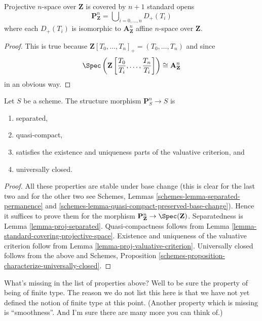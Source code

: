\begin{lemma}
\label{lemma-standard-covering-projective-space}
Projective $n$-space over $\mathbf{Z}$ is covered by
$n + 1$ standard opens
$$
\mathbf{P}^n_{\mathbf{Z}} =
\bigcup\nolimits_{i = 0, \ldots, n} D_{+}(T_i)
$$
where each $D_{+}(T_i)$ is isomorphic to $\mathbf{A}^n_{\mathbf{Z}}$
affine $n$-space over $\mathbf{Z}$.
\end{lemma}

\begin{proof}
This is true because
$\mathbf{Z}[T_0, \ldots, T_n]_{+} = (T_0, \ldots, T_n)$ and
since
$$
\Spec
\left(
\mathbf{Z}
\left[\frac{T_0}{T_i}, \ldots, \frac{T_n}{T_i}
\right]
\right)
\cong
\mathbf{A}^n_{\mathbf{Z}}
$$
in an obvious way.
\end{proof}

\begin{lemma}
\label{lemma-projective-space-separated}
Let $S$ be a scheme.
The structure morphism $\mathbf{P}^n_S \to S$ is
\begin{enumerate}
\item separated,
\item quasi-compact,
\item satisfies the existence and uniqueness parts of the valuative criterion,
and
\item universally closed.
\end{enumerate}
\end{lemma}

\begin{proof}
All these properties are stable under base change (this is clear for the
last two and for the other two see
Schemes, Lemmas
\ref{schemes-lemma-separated-permanence} and
\ref{schemes-lemma-quasi-compact-preserved-base-change}).
Hence it suffices to prove them for the morphism
$\mathbf{P}^n_{\mathbf{Z}} \to \Spec(\mathbf{Z})$.
Separatedness is Lemma \ref{lemma-proj-separated}. Quasi-compactness follows
from Lemma \ref{lemma-standard-covering-projective-space}.
Existence and uniqueness of the valuative criterion follow from
Lemma \ref{lemma-proj-valuative-criterion}.
Universally closed follows from the above and
Schemes, Proposition \ref{schemes-proposition-characterize-universally-closed}.
\end{proof}

\begin{remark}
\label{remark-missing-finite-type}
What's missing in the list of properties above? Well to be sure the property
of being of finite type. The reason we do not list this here is that we have
not yet defined the notion of finite type at this point. (Another property
which is missing is ``smoothness''. And I'm sure there are many more you can
think of.)
\end{remark}

